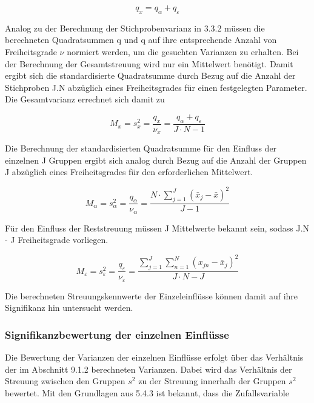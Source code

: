 \begin{equation}\label{eq:ninetwelve}
q_{x} =q_{\alpha } +q_{\varepsilon}
\end{equation}

\noindent Analog zu der Berechnung der Stichprobenvarianz in 3.3.2 m\"{u}ssen die berechneten Quadratsummen q und q auf ihre entsprechende Anzahl von Freiheitsgrade $\nu$ normiert werden, um die gesuchten Varianzen zu erhalten. Bei der Berechnung der Gesamtstreuung wird nur ein Mittelwert ben\"{o}tigt. Damit ergibt sich die standardisierte Quadratsumme durch Bezug auf die Anzahl der Stichproben J$.$N abz\"{u}glich eines Freiheitsgrades f\"{u}r einen festgelegten Parameter. Die Gesamtvarianz errechnet sich damit zu

\begin{equation}\label{eq:ninethirteen}
M_{x} =s_{x}^{2} =\dfrac{q_{x}}{\nu _{x}} =\dfrac{q_{\alpha} +q_{\varepsilon}}{J\cdot N-1}
\end{equation}

\noindent Die Berechnung der standardisierten Quadratsumme f\"{u}r den Einfluss der einzelnen J Gruppen ergibt sich analog durch Bezug auf die Anzahl der Gruppen J abz\"{u}glich eines Freiheitsgrades f\"{u}r den erforderlichen Mittelwert. 

\begin{equation}\label{eq:ninefourteen}
M_{\alpha} =s_{\alpha}^{2} =\dfrac{q_{\alpha}}{\nu _{\alpha}} =\dfrac{N\cdot \sum _{j=1}^{J}(\bar{x}_{j} -\bar{x})^{2}}{J-1}
\end{equation}

\noindent F\"{u}r den Einfluss der Reststreuung m\"{u}ssen J Mittelwerte bekannt sein, sodass J$.$N - J Freiheitsgrade vorliegen. 

\begin{equation}\label{eq:ninefifteen}
M_{\varepsilon} =s_{\varepsilon}^{2} =\dfrac{q_{\varepsilon}}{\nu _{\varepsilon}} =\dfrac{\sum _{j=1}^{J}\sum _{n=1}^{N}(x_{jn} -\bar{x}_{j})^{2}}{J\cdot N-J}
\end{equation}

\noindent Die berechneten Streuungskennwerte der Einzeleinfl\"{u}sse k\"{o}nnen damit auf ihre Signifikanz hin untersucht werden.

\subsubsection{Signifikanzbewertung der einzelnen Einfl\"{u}sse}

\noindent Die Bewertung der Varianzen der einzelnen Einfl\"{u}sse erfolgt \"{u}ber das Verh\"{a}ltnis der im Abschnitt 9.1.2 berechneten Varianzen. Dabei wird das Verh\"{a}ltnis der Streuung zwischen den Gruppen $s^{2}$ zu der Streuung innerhalb der Gruppen $s^{2}$ bewertet. Mit den Grundlagen aus 5.4.3 ist bekannt, dass die Zufallsvariable

